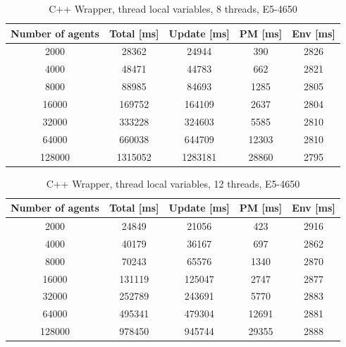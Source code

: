 \documentclass[12pt, a4paper]{report}
\begin{document}
\begin{appendices}
\begin{table}[H]
  \begin{center}
    \begin{tabular}{|c||c||c|c|c|}
    \hline
    Number of agents & Total [ms] & Update [ms] & PM [ms] & Env [ms] \\ \hline
    2000             & 28362      & 24944       & 390     & 2826     \\
    4000             & 48471      & 44783       & 662     & 2821     \\
    8000             & 88985      & 84693       & 1285    & 2805     \\
    16000            & 169752     & 164109      & 2637    & 2804     \\
    32000            & 333228     & 324603      & 5585    & 2810     \\
    64000            & 660038     & 644709      & 12303   & 2810     \\
    128000           & 1315052    & 1283181     & 28860   & 2795     \\ \hline
    \end{tabular}
    \caption {C++ Wrapper, thread local variables, 8 threads, E5-4650}
    \label{table:append-c++-wrap-8-thread-potoo}
  \end{center}
\end{table}


\begin{table}[H]
  \begin{center}
    \begin{tabular}{|c||c||c|c|c|}
    \hline
    Number of agents & Total [ms] & Update [ms] & PM [ms] & Env [ms] \\ \hline
    2000             & 24849      & 21056       & 423     & 2916     \\
    4000             & 40179      & 36167       & 697     & 2862     \\
    8000             & 70243      & 65576       & 1340    & 2870     \\
    16000            & 131119     & 125047      & 2747    & 2877     \\
    32000            & 252789     & 243691      & 5770    & 2883     \\
    64000            & 495341     & 479304      & 12691   & 2881     \\
    128000           & 978450     & 945744      & 29355   & 2888     \\ \hline
    \end{tabular}
    \caption {C++ Wrapper, thread local variables, 12 threads, E5-4650}
    \label{table:append-c++-wrap-12-thread-potoo}
  \end{center}
\end{table}


\end{appendices}
\end{document}
